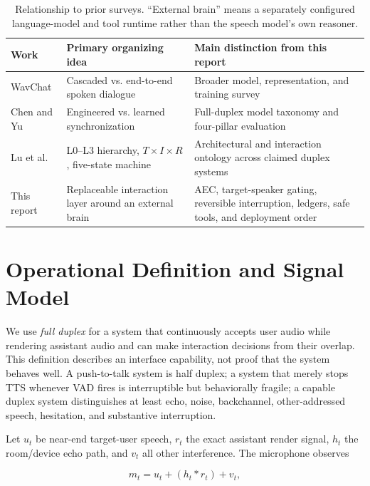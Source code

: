 \documentclass[11pt]{article}
\begin{document}
\begin{table}[ht]
\centering
\caption{Relationship to prior surveys. ``External brain'' means a separately
configured language-model and tool runtime rather than the speech model's own
reasoner.}
\label{tab:surveys}
\begin{tabularx}{\textwidth}{@{}P{0.20\textwidth}P{0.25\textwidth}Y@{}}
\toprule
Work & Primary organizing idea & Main distinction from this report \\
\midrule
WavChat \citep{ji2024wavchat} & Cascaded vs. end-to-end spoken dialogue & Broader model, representation, and training survey \\
Chen and Yu \citep{chen2025fdsurvey} & Engineered vs. learned synchronization & Full-duplex model taxonomy and four-pillar evaluation \\
Lu et al. \citep{lu2026fdsurvey} & L0--L3 hierarchy, $T\times I\times R$, five-state machine & Architectural and interaction ontology across claimed duplex systems \\
This report & Replaceable interaction layer around an external brain & AEC, target-speaker gating, reversible interruption, ledgers, safe tools, and deployment order \\
\bottomrule
\end{tabularx}
\end{table}

\section{Operational Definition and Signal Model}

We use \emph{full duplex} for a system that continuously accepts user audio
while rendering assistant audio and can make interaction decisions from their
overlap. This definition describes an interface capability, not proof that the
system behaves well. A push-to-talk system is half duplex; a system that merely
stops TTS whenever VAD fires is interruptible but behaviorally fragile; a
capable duplex system distinguishes at least echo, noise, backchannel,
other-addressed speech, hesitation, and substantive interruption.

Let $u_t$ be near-end target-user speech, $r_t$ the exact assistant render
signal, $h_t$ the room/device echo path, and $v_t$ all other interference. The
microphone observes

\begin{equation}
  m_t = u_t + (h_t * r_t) + v_t,
  \label{eq:mixture}
\end{equation}
\end{document}
